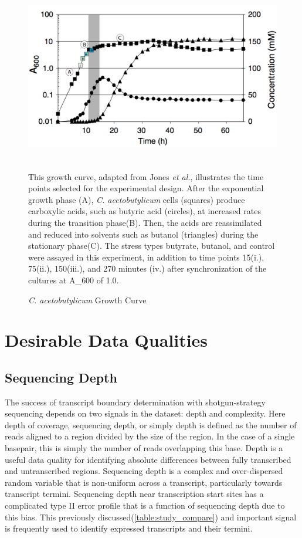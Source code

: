\begin{figure}[t]
\small
\includegraphics[width=\textwidth,height=3in]{images/Sequencing/Growth_curve.png}
\caption{\textit{C. acetobutylicum} Growth Curve}
\label{fig:4.1}
This growth curve, adapted from Jones \textit{et al.},\cite{180} illustrates the time points selected for the experimental design. After the exponential growth phase (A), \textit{C. acetobutylicum} cells (squares) produce carboxylic acids, such as butyric acid (circles), at increased rates during the transition phase(B). Then, the acids are reassimilated and reduced into solvents such as butanol (triangles) during the stationary phase(C). The stress types butyrate, butanol, and control were assayed in this experiment, in addition to time points 15(i.), 75(ii.), 150(iii.), and 270 minutes (iv.) after synchronization of the cultures at A_{600} of 1.0.
\end{figure}

\section{Desirable Data Qualities}
\subsection{Sequencing Depth}
The success of transcript boundary determination with shotgun-strategy sequencing depends on two signals in the dataset: depth and complexity.\cite{108,109,110,176,177} Here depth of coverage, sequencing depth, or simply depth is defined as the number of reads aligned to a region divided by the size of the region. In the case of a single basepair, this is simply the number of reads overlapping this base. Depth is a useful data quality for identifying absolute differences between fully transcribed and untranscribed regions. Sequencing depth is a complex and over-dispersed random variable\cite{52,53,181} that is non-uniform across a transcript,\cite{179} particularly towards transcript termini.\cite{18} Sequencing depth near transcription start sites has a complicated type II error profile that is a function of sequencing depth due to this bias. This previously discussed(\ref{table:study_compare}) and important signal is frequently used to identify expressed transcripts and their termini.

